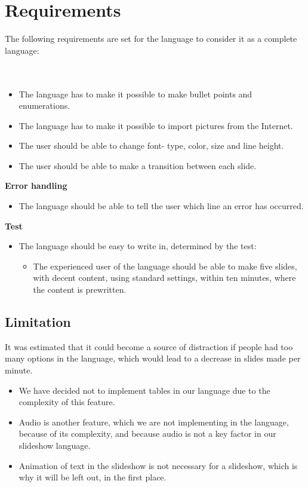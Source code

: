 \section{Requirements}
\label{LanguageRequirements}
The following requirements are set for the language to consider it as a complete language:
\\ \\
 \\
\begin{itemize}
\item The language has to make it possible to make bullet points and enumerations.
\item The language has to make it possible to import pictures from the Internet.
\item The user should be able to change font- type, color, size and line height.
\item The user should be able to make a transition between each slide. 
\end{itemize}
\textbf{Error handling}\\
\begin{itemize}
\item The language should be able to tell the user which line an error has occurred. 
\end{itemize}
\textbf{Test}\\
\begin{itemize}
\item The language should be easy to write in, determined by the test:
\begin{itemize}
\item The experienced user of the language should be able to make five slides, with decent content, using standard settings, within ten minutes, where the content is prewritten.
\end{itemize}
\end{itemize}

\subsection*{Limitation}
It was estimated that it could become a source of distraction if people had too many options in the language, which would lead to a decrease in slides made per minute.

\begin{itemize}
	\item We have decided not to implement tables in our language due to the complexity of this feature.
	\item Audio is another feature, which we are not implementing in the language, because of its complexity, and because audio is not a key factor in our slideshow language.
	\item Animation of text in the slideshow is not necessary for a slideshow, which is why it will be left out, in the first place.
\end{itemize}